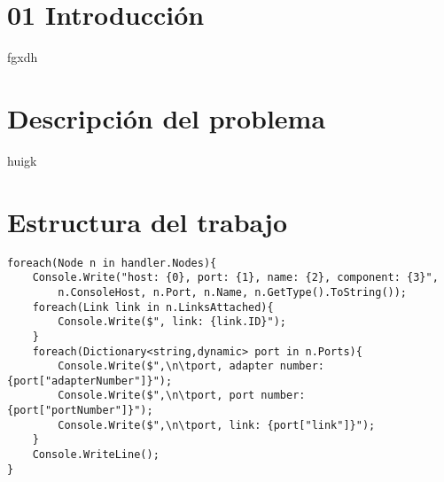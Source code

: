 
\section{01 Introducción}

fgxdh

\section{Descripción del problema}

huigk

\section{Estructura del trabajo}

\begin{lstlisting}[style=CodigoCs]
foreach(Node n in handler.Nodes){
	Console.Write("host: {0}, port: {1}, name: {2}, component: {3}",
		n.ConsoleHost, n.Port, n.Name, n.GetType().ToString());
	foreach(Link link in n.LinksAttached){
		Console.Write($", link: {link.ID}");
	}
	foreach(Dictionary<string,dynamic> port in n.Ports){
		Console.Write($",\n\tport, adapter number: {port["adapterNumber"]}");
		Console.Write($",\n\tport, port number: {port["portNumber"]}");
		Console.Write($",\n\tport, link: {port["link"]}");
	}
	Console.WriteLine();
}
\end{lstlisting}


